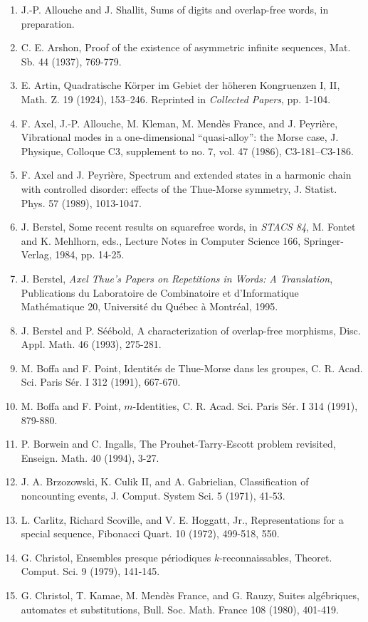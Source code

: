 \documentclass[10pt]{article}
\begin{document}
\begin{enumerate}
  \item J.-P. Allouche and J. Shallit, Sums of digits and overlap-free words, in preparation.
  \item C. E. Arshon, Proof of the existence of asymmetric infinite sequences, Mat. Sb. 44 (1937), 769-779.
  \item E. Artin, Quadratische Körper im Gebiet der höheren Kongruenzen I, II, Math. Z. 19 (1924), 153--246. Reprinted in \emph{Collected Papers}, pp. 1-104.
  \item F. Axel, J.-P. Allouche, M. Kleman, M. Mendès France, and J. Peyrière, Vibrational modes in a one-dimensional ``quasi-alloy'': the Morse case, J. Physique, Colloque C3, supplement to no. 7, vol. 47 (1986), C3-181--C3-186.
  \item F. Axel and J. Peyrière, Spectrum and extended states in a harmonic chain with controlled disorder: effects of the Thue-Morse symmetry, J. Statist. Phys. 57 (1989), 1013-1047.
  \item J. Berstel, Some recent results on squarefree words, in \emph{STACS 84}, M. Fontet and K. Mehlhorn, eds., Lecture Notes in Computer Science 166, Springer-Verlag, 1984, pp. 14-25.
  \item J. Berstel, \emph{Axel Thue's Papers on Repetitions in Words: A Translation}, Publications du Laboratoire de Combinatoire et d'Informatique Mathématique 20, Université du Québec à Montréal, 1995.
  \item J. Berstel and P. Séébold, A characterization of overlap-free morphisms, Disc. Appl. Math. 46 (1993), 275-281.
  \item M. Boffa and F. Point, Identités de Thue-Morse dans les groupes, C. R. Acad. Sci. Paris Sér. I 312 (1991), 667-670.
  \item M. Boffa and F. Point, $m$-Identities, C. R. Acad. Sci. Paris Sér. I 314 (1991), 879-880.
  \item P. Borwein and C. Ingalls, The Prouhet-Tarry-Escott problem revisited, Enseign. Math. 40 (1994), 3-27.
  \item J. A. Brzozowski, K. Culik II, and A. Gabrielian, Classification of noncounting events, J. Comput. System Sci. 5 (1971), 41-53.
  \item L. Carlitz, Richard Scoville, and V. E. Hoggatt, Jr., Representations for a special sequence, Fibonacci Quart. 10 (1972), 499-518, 550.
  \item G. Christol, Ensembles presque périodiques $k$-reconnaissables, Theoret. Comput. Sci. 9 (1979), 141-145.
  \item G. Christol, T. Kamae, M. Mendès France, and G. Rauzy, Suites algébriques, automates et substitutions, Bull. Soc. Math. France 108 (1980), 401-419.

\end{enumerate}
\end{document}
